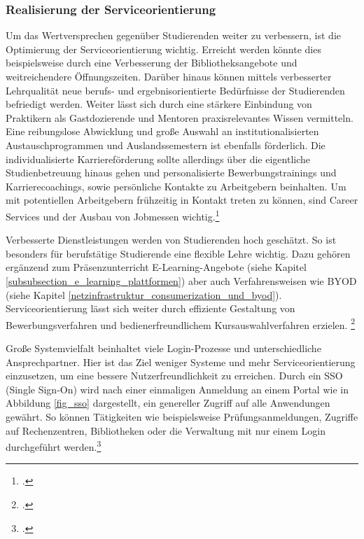 \subsubsection{Realisierung der Serviceorientierung}
\label{realisierung_der_serviceorientierung}
Um das Wertversprechen gegenüber Studierenden weiter zu verbessern, ist die Optimierung der Serviceorientierung wichtig. Erreicht werden könnte dies beispielsweise durch eine Verbesserung der Bibliotheksangebote und weitreichendere Öffnungszeiten. Darüber hinaus können mittels verbesserter Lehrqualität neue berufs- und ergebnisorientierte Bedürfnisse der Studierenden befriedigt werden. Weiter lässt sich durch eine stärkere Einbindung von Praktikern als Gastdozierende und Mentoren praxisrelevantes Wissen vermitteln. Eine reibungslose Abwicklung und große Auswahl an institutionalisierten Austauschprogrammen und Auslandssemestern ist ebenfalls förderlich. Die individualisierte Karriereförderung sollte allerdings über die eigentliche Studienbetreuung hinaus gehen und personalisierte Bewerbungstrainings und Karrierecoachings, sowie persönliche Kontakte zu Arbeitgebern beinhalten. Um mit potentiellen Arbeitgebern frühzeitig in Kontakt treten zu können, sind Career Services und der Ausbau von Jobmessen wichtig.\footcite[Vgl.][13]{schroeder_2011}

Verbesserte Dienstleistungen werden von Studierenden hoch geschätzt. So ist besonders für berufstätige Studierende eine flexible Lehre wichtig. Dazu gehören ergänzend zum Präsenzunterricht E-Learning-Angebote (siehe Kapitel \ref{subsubsection_e_learning_plattformen}) aber auch Verfahrensweisen wie BYOD (siehe Kapitel \ref{netzinfrastruktur_consumerization_und_byod}). Serviceorientierung lässt sich weiter durch effiziente Gestaltung von Bewerbungsverfahren und bedienerfreundlichem Kursauswahlverfahren erzielen. \footcite[Vgl.][18]{deutsche_wissenschaft_2010}

Große Systemvielfalt beinhaltet viele Login-Prozesse und unterschiedliche Ansprechpartner. Hier ist das Ziel weniger Systeme  und mehr Serviceorientierung einzusetzen, um eine bessere Nutzerfreundlichkeit zu erreichen. Durch ein SSO (Single Sign-On) wird nach einer einmaligen Anmeldung an einem Portal wie in Abbildung \ref{fig_sso} dargestellt, ein genereller Zugriff auf alle Anwendungen gewährt. So können Tätigkeiten wie beispielsweise Prüfungsanmeldungen, Zugriffe auf Rechenzentren, Bibliotheken oder die Verwaltung mit nur einem Login durchgeführt werden.\footcite[Vgl.][81]{deutsche_wissenschaft_2010}

